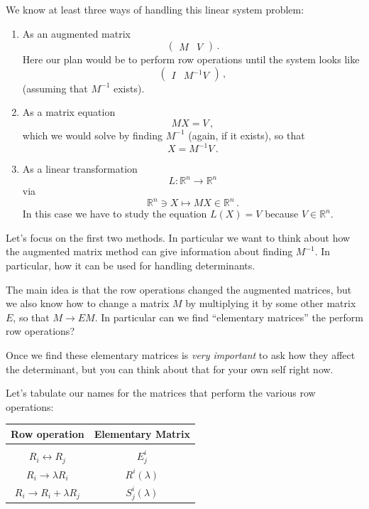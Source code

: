 {We know at least three ways of handling this linear system problem:
\begin{enumerate}
\item As an augmented matrix
\[
\left(
\begin{array}{c|c}
M & V
\end{array}
\right)\, .
\]
Here our plan would be to perform row operations until the system looks like
\[
\left(
\begin{array}{c|c}
I & M^{-1}V
\end{array}
\right)\, ,
\]
(assuming that $M^{-1}$ exists).
\item As a matrix equation
\[
MX=V\, ,
\]
which we would solve by finding $M^{-1}$ (again, if it exists), so that
\[
X=M^{-1}V\, .
\]
\item As a linear transformation
\[L:{\mathbb R}^n\longrightarrow {\mathbb R}^n\]
via
\[
{\mathbb R}^n\ni X \longmapsto MX \in {\mathbb R}^n\, .
\]
In this case we have to study the equation $L(X)=V$ because $V\in {\mathbb R}^n$.
\end{enumerate}
Let's focus on the first two methods. In particular we want to think about how the augmented matrix  method can give information about finding $M^{-1}$. In particular, how it can be used for handling determinants. 

The main idea is that the row operations changed the augmented matrices, but we also know how to change a matrix $M$ by multiplying it by some other matrix $E$, so that $M\to EM$.
In particular can we find ``elementary matrices'' the perform row operations?

Once we find these elementary matrices is {\itshape very important} to  ask how they affect the determinant, but you can think about that for your own self  right now. 

Let's tabulate our names for the matrices that perform the various row operations:
\begin{center}
\begin{tabular}{cc}
Row operation & Elementary Matrix\smallskip\\\hline\\
$R_i\leftrightarrow R_j$ & $E^i_j$\\\smallskip
$R_i\to \lambda R_i$ & $R^i(\lambda)$\\\smallskip
$R_i\to R_i+\lambda R_j$ & $S^i_j(\lambda)$
\end{tabular}
\end{center}

}
